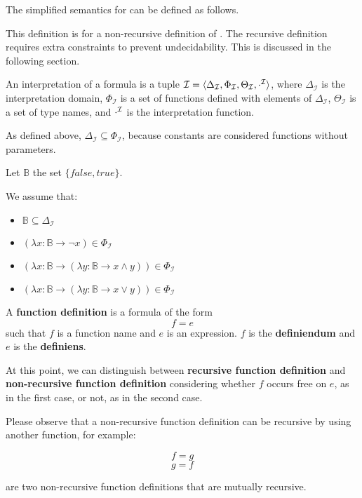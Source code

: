 \newcommand{\DeltaI}{\ensuremath{\Delta _{\mathcal{I}}}}
\newcommand{\ThetaI}{\ensuremath{\Theta _{\mathcal{I}}}}
\newcommand{\PhiI}{\ensuremath{\Phi _{\mathcal{I}}}}

\newcommand{\lambd}[2]{\ensuremath{(\lambda {#1} \to {#2})}}

The simplified semantics for \Soda can be defined as follows.

This definition is for a non-recursive definition of \Soda.
The recursive definition requires extra constraints to prevent undecidability.
This is discussed in the following section.

An interpretation of a \Soda formula is a tuple $\mathcal{I} = \langle \DeltaI, \PhiI, \ThetaI, \I{\cdot} \rangle$, where $\DeltaI$ is the interpretation domain, $\PhiI$ is a set of functions defined with elements of $\DeltaI$, $\ThetaI$ is a set of type names, and ${\cdot}^{\mathcal{I}}$ is the interpretation function.

As defined above, $\DeltaI \subseteq \PhiI$, because constants are considered functions without parameters.

Let $\mathbb{B}$ the set $\{false, true\}$.

We assume that:
\begin{itemize}
    \item $\mathbb{B} \subseteq \DeltaI$
    \item $\lambd{x: \mathbb{B}}{\lnot x} \in \PhiI$
    \item $\lambd{x: \mathbb{B}}{\lambd{y: \mathbb{B}}{x \land y}} \in \PhiI$
    \item $\lambd{x: \mathbb{B}}{\lambd{y: \mathbb{B}}{x \lor y}} \in \PhiI$
\end{itemize}

A \textbf{function definition} is a formula of the form
\[f = e\]
such that $f$ is a function name and $e$ is an expression.
$f$ is the \textbf{definiendum} and $e$ is the \textbf{definiens}.


At this point, we can distinguish between \textbf{recursive function definition} and \textbf{non-recursive function definition} considering whether $f$ occurs free on $e$,
as in the first case, or not, as in the second case.

Please observe that a non-recursive function definition can be recursive by using another function, for example:
\begin{center}
    \[f = g\]
    \[g = f\]
\end{center}
are two non-recursive function definitions that are mutually recursive.

